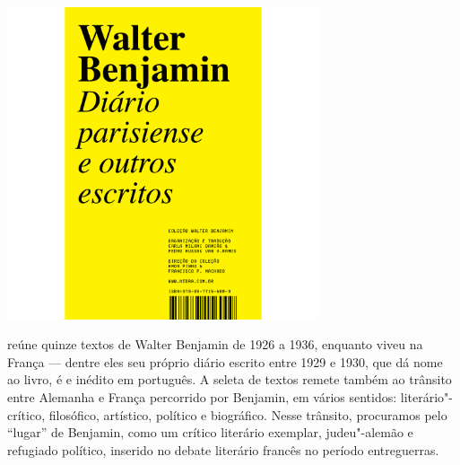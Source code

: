 \vfill

\hspace*{-.4cm}\begin{minipage}[c]{.5\linewidth}
\small{
{}}
\end{minipage}


\pagebreak

\hspace{.5cm}

\begin{center}
\hspace*{.5cm}\includegraphics[width=92mm]{./grid/benjamin2.jpg}
\end{center}

\hspace*{-7cm}\hrulefill\hspace*{-7cm}

\medskip

 reúne quinze textos de Walter Benjamin de 1926 a 1936, enquanto viveu na França --- dentre eles seu próprio diário escrito entre 1929 e 1930, que dá nome ao livro, é e inédito em português. A seleta de textos remete também ao trânsito entre Alemanha e França percorrido por Benjamin, em vários sentidos: literário"-crítico, filosófico, artístico, político e biográfico. Nesse trânsito, procuramos pelo “lugar” de Benjamin, como um crítico literário exemplar, judeu"-alemão e refugiado político, inserido no debate literário francês no período entreguerras.

